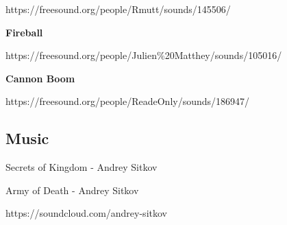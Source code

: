 https://freesound.org/people/Rmutt/sounds/145506/

\textbf{Fireball}

https://freesound.org/people/Julien\%20Matthey/sounds/105016/

\textbf{Cannon Boom}

https://freesound.org/people/ReadeOnly/sounds/186947/

\subsection{Music}

Secrets of Kingdom - Andrey Sitkov

Army of Death - Andrey Sitkov 

https://soundcloud.com/andrey-sitkov

